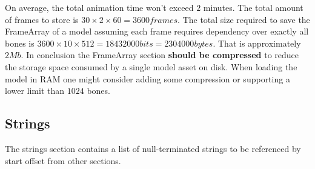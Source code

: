 On average, the total animation time won't exceed $2$ minutes.\newline
The total amount of frames to store is $30 \times 2 \times 60 = 3600frames$.\newline
The total size required to save the FrameArray of a model assuming each frame requires dependency over exactly all bones is $3600 \times 10 \times 512 = 18432000bits = 2304000bytes$. That is approximately $2Mb$.
\vspace{12pt}
\newline
In conclusion the FrameArray section \textbf{should be compressed} to reduce the storage space consumed by a single model asset on disk. When loading the model in RAM one might consider adding some compression or supporting a lower limit than $1024$ bones.

\subsection{Strings}
The strings section contains a list of null-terminated strings to be referenced by start offset from other sections.